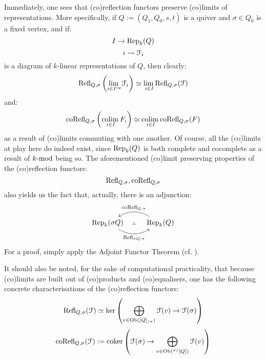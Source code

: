             \begin{remark} \label{remark: categorical_properties_of_(co)reflection_functors}
                Immediately, one sees that (co)reflection functors preserve (co)limits of representations. More specifically, if $Q := (Q_1, Q_0, s, t)$ is a quiver and $\sigma \in Q_0$ is a fixed vertex, and if:
                    $$I \to \Rep_k(Q)$$
                    $$i \mapsto \calF_i$$
                is a diagram of $k$-linear representations of $Q$, then clearly:
                    $$\Refl_{Q, \sigma}\left( \underset{i \in I^{\op}}{\lim} \calF_i \right) \cong \underset{i \in I}{\lim} \Refl_{Q, \sigma}(\calF)$$
                and:
                    $$\co\Refl_{Q, \sigma}\left( \underset{i \in I}{\colim} F_i \right) \cong \underset{i \in I}{\colim} \co\Refl_{Q, \sigma}(F)$$
                as a result of (co)limits commuting with one another. Of course, all the (co)limits at play here do indeed exist, since $\Rep_k(Q)$ is both complete and cocomplete as a result of $k\mod$ being so. The aforementioned (co)limit preserving properties of the (co)reflection functors:
                    $$\Refl_{Q, \sigma}, \co\Refl_{Q, \sigma}$$
                also yields us the fact that, actually, there is an adjunction:
                    $$
                        \begin{tikzcd}
                        	{\Rep_k(\sigma Q)} & {\Rep_k(Q)}
                        	\arrow[""{name=0, anchor=center, inner sep=0}, "{\Refl_{\sigma Q, \sigma}}"', bend right, from=1-1, to=1-2]
                        	\arrow[""{name=1, anchor=center, inner sep=0}, "{\co\Refl_{Q, \sigma}}"', bend right, from=1-2, to=1-1]
                        	\arrow["\dashv"{anchor=center, rotate=-90}, draw=none, from=1, to=0]
                        \end{tikzcd}
                    $$
                For a proof, simply apply the Adjoint Functor Theorem (cf. \cite{nlab:adjoint_functor_theorem}).
                
                It should also be noted, for the sake of computational practicality, that because (co)limits are built out of (co)products and (co)equalisers, one has the following concrete characterisations of the (co)reflection functors:
                    $$\Refl_{Q, \sigma}(\calF) \cong \ker\left(\bigoplus_{v \in \Ob([Q]_{/\sigma})} \calF(v) \to \calF(\sigma)\right)$$
                    $$\co\Refl_{Q, \sigma}(\calF) := \coker\left(\calF(\sigma) \to \bigoplus_{v \in \Ob({}^{\sigma/}[Q])} \calF(v)\right)$$
            \end{remark}
